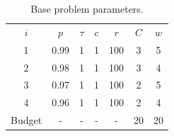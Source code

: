 \documentclass[11pt,authoryear,a4paper]{article}
\theoremstyle{definition}
\begin{document}
\begin{table}[tbp]
    \parbox{.45\linewidth}{
    \centering
    \begin{tabular}{ccccccc}
    \hline
    $i$ & $p$ & $\tau$ & $c$ & $r$ & $C$ & $w$ \\
    1 & 0.99 & 1 & 1 & 100 & 3 & 5\\
    2 & 0.98 & 1 & 1 & 100 & 3 & 4\\
    3 & 0.97 & 1 & 1 & 100 & 2 & 5\\
    4 & 0.96 & 1 & 1 & 100 & 2 & 4\\
    Budget & - & - & - & - & 20 & 20\\
    \hline
    \end{tabular}
    \caption{Base problem parameters.}
    \label{tab:probParams}
    \vspace{1em}

}
\end{table}
\end{document}
